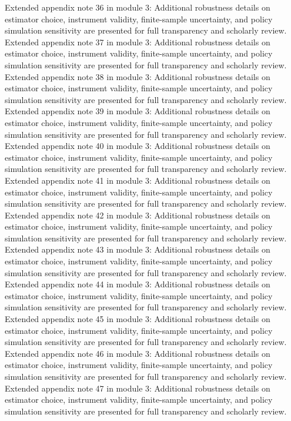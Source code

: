\documentclass[preprint,12pt]{elsarticle}
\begin{document}
Extended appendix note 36 in module 3: Additional robustness details on estimator choice, instrument validity, finite-sample uncertainty, and policy simulation sensitivity are presented for full transparency and scholarly review.
Extended appendix note 37 in module 3: Additional robustness details on estimator choice, instrument validity, finite-sample uncertainty, and policy simulation sensitivity are presented for full transparency and scholarly review.
Extended appendix note 38 in module 3: Additional robustness details on estimator choice, instrument validity, finite-sample uncertainty, and policy simulation sensitivity are presented for full transparency and scholarly review.
Extended appendix note 39 in module 3: Additional robustness details on estimator choice, instrument validity, finite-sample uncertainty, and policy simulation sensitivity are presented for full transparency and scholarly review.
Extended appendix note 40 in module 3: Additional robustness details on estimator choice, instrument validity, finite-sample uncertainty, and policy simulation sensitivity are presented for full transparency and scholarly review.
Extended appendix note 41 in module 3: Additional robustness details on estimator choice, instrument validity, finite-sample uncertainty, and policy simulation sensitivity are presented for full transparency and scholarly review.
Extended appendix note 42 in module 3: Additional robustness details on estimator choice, instrument validity, finite-sample uncertainty, and policy simulation sensitivity are presented for full transparency and scholarly review.
Extended appendix note 43 in module 3: Additional robustness details on estimator choice, instrument validity, finite-sample uncertainty, and policy simulation sensitivity are presented for full transparency and scholarly review.
Extended appendix note 44 in module 3: Additional robustness details on estimator choice, instrument validity, finite-sample uncertainty, and policy simulation sensitivity are presented for full transparency and scholarly review.
Extended appendix note 45 in module 3: Additional robustness details on estimator choice, instrument validity, finite-sample uncertainty, and policy simulation sensitivity are presented for full transparency and scholarly review.
Extended appendix note 46 in module 3: Additional robustness details on estimator choice, instrument validity, finite-sample uncertainty, and policy simulation sensitivity are presented for full transparency and scholarly review.
Extended appendix note 47 in module 3: Additional robustness details on estimator choice, instrument validity, finite-sample uncertainty, and policy simulation sensitivity are presented for full transparency and scholarly review.
\end{document}
